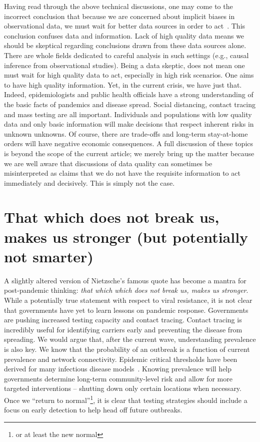 \documentclass[aoas]{amsart}
\begin{document}
Having read through the above technical discussions, one may come to the incorrect conclusion that because we are concerned about implicit biases in observational data, we must wait for better data sources in order to act~\citep{Ioannidis2020}.  This conclusion confuses data and information.  Lack of high quality data means we should be skeptical regarding conclusions drawn from these data sources alone.  There are whole fields dedicated to careful analysis in such settings (e.g., causal inference from observational studies).  Being a data skeptic, does not mean one must wait for high quality data to act, especially in high risk scenarios.  One aims to have high quality information.  Yet, in the current crisis, we have just that.  Indeed, epidemiologists and public health officials have a strong understanding of the basic facts of pandemics and disease spread.  Social distancing, contact tracing and mass testing are all important.  Individuals and populations with low quality data and only basic information will make decisions that respect inherent risks in unknown unknowns. Of course, there are trade-offs and long-term stay-at-home orders will have negative economic consequences.  A full discussion of these topics is beyond the scope of the current article; we merely bring up the matter because we are well aware that discussions of data quality can sometimes be misinterpreted as claims that we do not have the requisite information to act immediately and decisively.  This is simply not the case.

\section{That which does not break us, makes us stronger (but potentially not smarter)}
\label{section:testingcomments}

A slightly altered version of Nietzsche's famous quote has become a mantra for post-pandemic thinking: \emph{that which which does not break us, makes us stronger}.  While a potentially true statement with respect to viral resistance, it is not clear that governments have yet to learn lessons on pandemic response. Governments are pushing increased testing capacity and contact tracing.  Contact tracing is incredibly useful for identifying carriers early and preventing the disease from spreading.  We would argue that, after the current wave, understanding prevalence is also key.  We know that the probability of an outbreak is a function of current prevalence and network connectivity.  Epidemic critical thresholds have been derived for many infectious disease models~\cite{Pastor2001,Newman2002,Parshani2010}.  Knowing prevalence will help governments determine long-term community-level risk and allow for more targeted interventions -- shutting down only certain locations when necessary. Once we ``return to normal''\footnote{or at least the new normal}, it is clear that testing strategies should include a focus on early detection to help head off future outbreaks.
\end{document}
